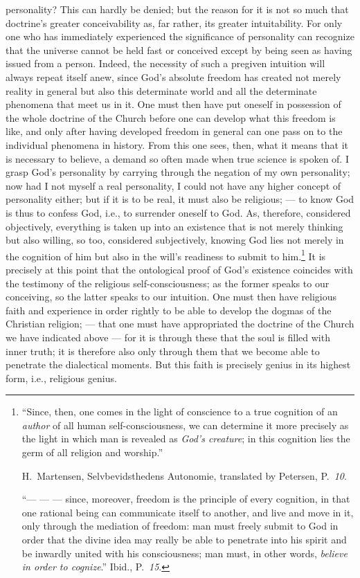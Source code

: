 \documentclass[12pt]{book}
\newcommand{\opage}[1]{\marginnote{\footnotesize\textit{[#1]}}}
\begin{document}
personality? This can hardly be denied; but the reason for it is not so much
that doctrine's greater conceivability as, far rather, its
\opage{46} \setcounter{footnote}{0}%
greater intuitability. For only one who has immediately experienced the
significance of personality can recognize that the universe cannot be held fast
or conceived except by being seen as having issued from a person. Indeed, the
necessity of such a pregiven intuition will always repeat itself anew, since
God's absolute freedom has created not merely reality in general but also this
determinate world and all the determinate phenomena that meet us in it. One
must then have put oneself in possession of the whole doctrine of the Church
before one can develop what this freedom is like, and only after having
developed freedom in general can one pass on to the individual phenomena in
history. From this one sees, then, what it means that it is necessary to
believe, a demand so often made when true science is spoken of. I grasp God's
personality by carrying through the negation of my own personality; now had I
not myself a real personality, I could not have any higher concept of
personality either; but if it is to be real, it must also be religious; --- to
know God is thus to confess God, i.e., to surrender oneself to God. As,
therefore, considered objectively, everything is taken up into an existence
that is not merely thinking but also willing, so too, considered subjectively,
knowing God lies not merely in the cognition of him but also in the will's
readiness to submit to him.\footnote{``Since, then, one comes in the light of
conscience to a true cognition of an \emph{author} of all human
self-consciousness, we can determine it more precisely as the light in which
man is revealed as \emph{God's creature}; in this cognition lies the germ of all
religion and worship.''
\par H.\ Martensen, Selvbevidsthedens Autonomie, translated by Petersen,
P.\ \textit{10}.
\par ``--- --- --- since, moreover, freedom is the principle of every cognition,
in that one rational being can communicate itself to another, and live and move
in it, only through the mediation of freedom: man must freely submit to God in
order that the divine idea may really be able to penetrate into his spirit and
be inwardly united with his consciousness; man must, in other words,
\emph{believe in order to cognize}.'' Ibid., P.\ \textit{15}.}
\opage{47} %
It is precisely at this point that the ontological proof of God's existence
coincides with the testimony of the religious self-consciousness; as the former
speaks to our conceiving, so the latter speaks to our intuition. One must then
have religious faith and experience in order rightly to be able to develop the
dogmas of the Christian religion; --- that one must have appropriated the
doctrine of the Church we have indicated above --- for it is through these that
the soul is filled with inner truth; it is therefore also only through them
that we become able to penetrate the dialectical moments. But this faith is
precisely genius in its highest form, i.e., religious genius.
\end{document}
